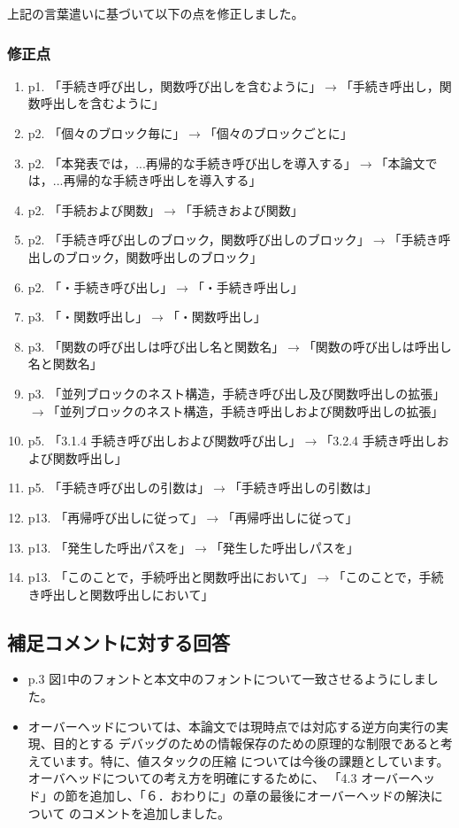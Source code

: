 \documentclass[a4j]{jarticle}
\begin{document}
上記の言葉遣いに基づいて以下の点を修正しました。
\subsubsection*{修正点}
\begin{enumerate}
\item p1. 「手続き呼び出し，関数呼び出しを含むように」$\rightarrow$「手続き呼出し，関数呼出しを含むように」
\item p2. 「個々のブロック毎に」$\rightarrow$「個々のブロックごとに」
\item p2. 「本発表では，...再帰的な手続き呼び出しを導入する」$\rightarrow$「本論文では，...再帰的な手続き呼出しを導入する」
\item p2. 「手続および関数」$\rightarrow$「手続きおよび関数」
\item p2. 「手続き呼び出しのブロック，関数呼び出しのブロック」$\rightarrow$「手続き呼出しのブロック，関数呼出しのブロック」
\item p2. 「・手続き呼び出し」$\rightarrow$「・手続き呼出し」
\item p3. 「・関数呼出し」$\rightarrow$「・関数呼出し」
\item p3. 「関数の呼び出しは呼び出し名と関数名」$\rightarrow$「関数の呼び出しは呼出し名と関数名」
\item p3. 「並列ブロックのネスト構造，手続き呼び出し及び関数呼出しの拡張」$\rightarrow$「並列ブロックのネスト構造，手続き呼出しおよび関数呼出しの拡張」
\item p5. 「3.1.4  手続き呼び出しおよび関数呼び出し」$\rightarrow$「3.2.4  手続き呼出しおよび関数呼出し」
\item p5. 「手続き呼び出しの引数は」$\rightarrow$「手続き呼出しの引数は」
\item p13. 「再帰呼び出しに従って」$\rightarrow$「再帰呼出しに従って」
\item p13. 「発生した呼出パスを」$\rightarrow$「発生した呼出しパスを」
\item p13. 「このことで，手続呼出と関数呼出において」$\rightarrow$「このことで，手続き呼出しと関数呼出しにおいて」
\end{enumerate}

\subsection*{補足コメントに対する回答}
\begin{itemize}
\item p.3 図1中のフォントと本文中のフォントについて一致させるようにしました。
\item オーバーヘッドについては、本論文では現時点では対応する逆方向実行の実現、目的とする
デバッグのための情報保存のための原理的な制限であると考えています。特に、値スタックの圧縮
については今後の課題としています。オーバヘッドについての考え方を明確にするために、
「4.3 オーバーヘッド」の節を追加し、「６．おわりに」の章の最後にオーバーヘッドの解決について
のコメントを追加しました。
\end{itemize}
\end{document}

